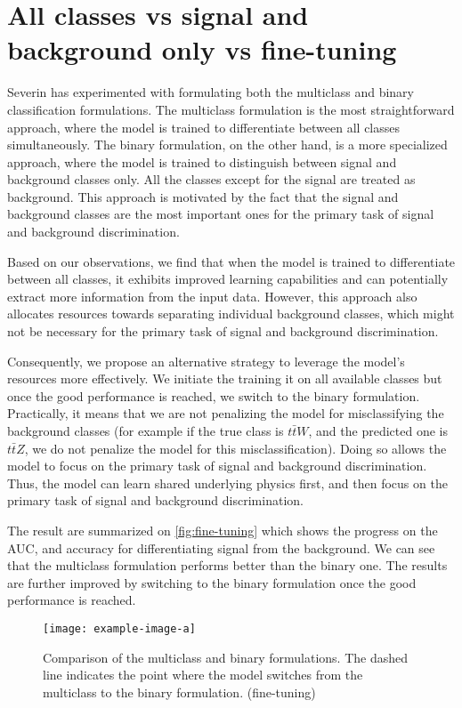 \section{All classes vs signal and background only vs fine-tuning}


Severin has experimented with formulating both the multiclass and binary classification formulations. The multiclass
formulation is the most straightforward approach, where the model is trained to differentiate between all classes
simultaneously. The binary formulation, on the other hand, is a more specialized approach, where the model is trained to
distinguish between signal and background classes only. All the classes except for the signal are treated as background.
This approach is motivated by the fact that the signal and background classes are the most important ones for the
primary task of signal and background discrimination.

Based on our observations, we find that when the model is trained to differentiate between all classes, it exhibits
improved learning capabilities and can potentially extract more information from the input data. However, this approach
also allocates resources towards separating individual background classes, which might not be necessary for the primary
task of signal and background discrimination.

Consequently, we propose an alternative strategy to leverage the model's resources more effectively. We initiate the
training it on all available classes but once the good performance is reached, we switch to the binary formulation.
Practically, it means that we are not penalizing the model for misclassifying the background classes (for example if the
true class is $t\bar{t}W$, and the predicted one is $t\bar{t}Z$, we do not penalize the model for this
misclassification). Doing so allows the model to focus on the primary task of signal and background discrimination.
Thus, the model can learn shared underlying physics first, and then focus on the primary task of signal and background
discrimination.

The result are summarized on \autoref{fig:fine-tuning} which shows the progress on the AUC, and accuracy for
differentiating signal from the background.  We can see that the multiclass formulation performs better than the binary
one. The results are further improved by switching to the binary formulation once the good performance is reached.

\begin{figure}[htbp]
    \centering
    \texttt{[image: example-image-a]}
    \caption{Comparison of the multiclass and binary formulations. The dashed line indicates the point where the model
        switches from the multiclass to the binary formulation. (fine-tuning)}
    \label{fig:fine-tuning}
\end{figure}